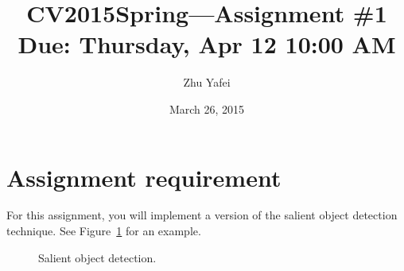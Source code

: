 \documentclass[12pt]{article}
\begin{document}
\title{\vspace{-2em}CV2015Spring---Assignment \#\textbf{1}\\
\normalsize{Due: Thursday, Apr 12 10:00 AM}}
\author{Zhu Yafei}
\date{\vspace{-0.7em}March 26, 2015\vspace{-0.7em}}
\maketitle\thispagestyle{fancy}
\maketitle


\section{Assignment requirement}

For this assignment, you will implement a version of the salient object detection technique. See Figure~\ref{fig: result} for an example.

\begin{figure}[!ht]
  \centering 
  \caption{Salient object detection.}
  \label{fig: result} %
\end{figure}
\end{document}
